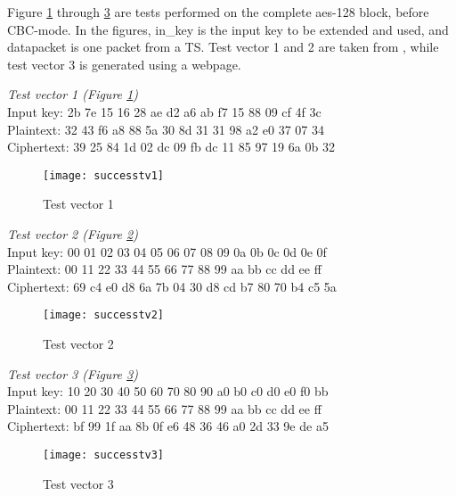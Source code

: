 Figure \ref{test:1} through \ref{test:3} are tests performed on the complete 
aes-128 block, before CBC-mode. In the figures, in\_key is the input key to be 
extended and used, and datapacket is one packet from a TS. Test vector 1 and 2 
are taken from \citep{AES:2001}, while test vector 3 is generated using a 
webpage.

\emph{Test vector 1 (Figure \ref{test:1})}\\
Input key: 2b 7e 15 16 28 ae d2 a6 ab f7 15 88 09 cf 4f 3c\\
Plaintext: 32 43 f6 a8 88 5a 30 8d 31 31 98 a2 e0 37 07 34\\
Ciphertext: 39 25 84 1d 02 dc 09 fb dc 11 85 97 19 6a 0b 32

\begin{figure}
  \texttt{[image: successtv1]}
  \caption{Test vector 1}
  \label{test:1}
\end{figure}

\emph{Test vector 2 (Figure \ref{test:2})}\\
Input key: 00 01 02 03 04 05 06 07 08 09 0a 0b 0c 0d 0e 0f\\
Plaintext: 00 11 22 33 44 55 66 77 88 99 aa bb cc dd ee ff\\
Ciphertext: 69 c4 e0 d8 6a 7b 04 30 d8 cd b7 80 70 b4 c5 5a

\begin{figure}
  \texttt{[image: successtv2]}
  \caption{Test vector 2}
  \label{test:2}
\end{figure}

\emph{Test vector 3 (Figure \ref{test:3})} \\
Input key: 10 20 30 40 50 60 70 80 90 a0 b0 c0 d0 e0 f0 bb\\
Plaintext: 00 11 22 33 44 55 66 77 88 99 aa bb cc dd ee ff\\
Ciphertext: bf 99 1f aa 8b 0f e6 48 36 46 a0 2d 33 9e de a5

\begin{figure}
  \texttt{[image: successtv3]}
  \caption{Test vector 3}
  \label{test:3}
\end{figure}
